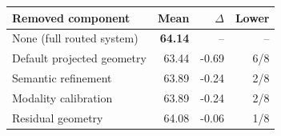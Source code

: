 \begin{tabular}{lrrr}
\toprule
Removed component & Mean & $\Delta$ & Lower \\
\midrule
None (full routed system) & \textbf{64.14} & -- & -- \\
Default projected geometry & 63.44 & -0.69 & 6/8 \\
Semantic refinement & 63.89 & -0.24 & 2/8 \\
Modality calibration & 63.89 & -0.24 & 2/8 \\
Residual geometry & 64.08 & -0.06 & 1/8 \\
\bottomrule
\end{tabular}
